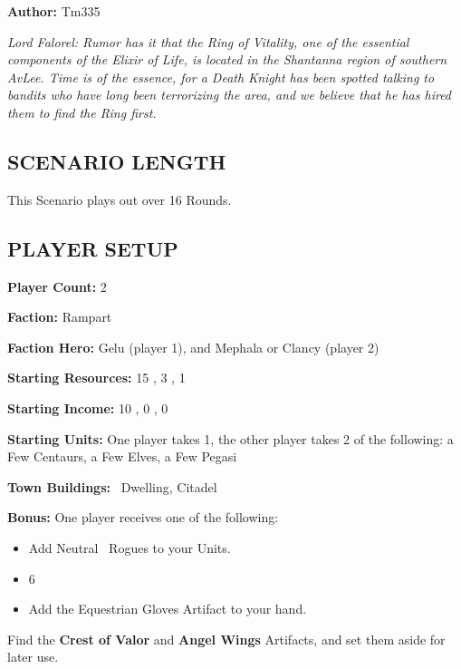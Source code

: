 
\begin{multicols*}{2}

\textbf{Author:} Tm335

\textit{Lord Falorel: Rumor has it that the Ring of Vitality, one of the essential components of the Elixir of Life, is located in the Shantanna region of southern AvLee.
  Time is of the essence, for a Death Knight has been spotted talking to bandits who have long been terrorizing the area, and we believe that he has hired them to find the Ring first.
}


\subsection*{\MakeUppercase{Scenario Length}}

This Scenario plays out over 16 Rounds.

\subsection*{\MakeUppercase{Player Setup}}

\textbf{Player Count:} 2

\textbf{Faction:} Rampart

\textbf{Faction Hero:} Gelu (player 1), and Mephala or Clancy (player 2)

\textbf{Starting Resources:} 15 , 3 , 1 

\textbf{Starting Income:} 10 , 0 , 0 

\textbf{Starting Units:} One player takes 1, the other player takes 2 of the following: a Few Centaurs, a Few Elves, a Few Pegasi

\textbf{Town Buildings:} \bronze\ Dwelling, Citadel

\textbf{Bonus:} One player receives one of the following:
\begin{itemize}
  \item Add Neutral \bronze\ Rogues to your Units.
  \item 6 
  \item Add the Equestrian Gloves Artifact to your hand.
\end{itemize}

Find the \textbf{Crest of Valor} and \textbf{Angel Wings} Artifacts, and set them aside for later use.


\end{multicols*}
